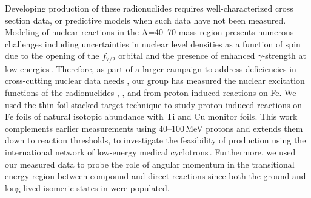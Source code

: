 Developing production of these radionuclides requires well-characterized cross section data, or predictive models when such data have not been measured.   
Modeling of nuclear reactions in 
the A=40--70 mass region presents numerous challenges including uncertainties in nuclear level densities as a function of spin due to the opening of the $f_{7/2}$ orbital and the presence of enhanced $\gamma$-strength at low energies\,\cite{Voinov2004a,Algin2008,Algin2007}.  
Therefore, as part of a larger campaign to address deficiencies in cross-cutting nuclear data needs \cite{Bernstein2019a}, our group has
measured the   nuclear excitation functions of the radionuclides ,   , and  from proton-induced reactions on Fe.
We used the thin-foil stacked-target technique to study proton-induced reactions on 
Fe foils of natural isotopic abundance with 
Ti and 
Cu monitor foils.
This work 
complements 
earlier measurements using 40--100\,MeV protons  and extends them down to reaction thresholds,  to investigate the feasibility of production using the international network   of low-energy medical cyclotrons\,\cite{Graves2016}. 
Furthermore, 
we used our measured data to probe the role of angular momentum in the transitional energy region between compound and direct reactions since both the ground and long-lived isomeric states in  were populated.  









